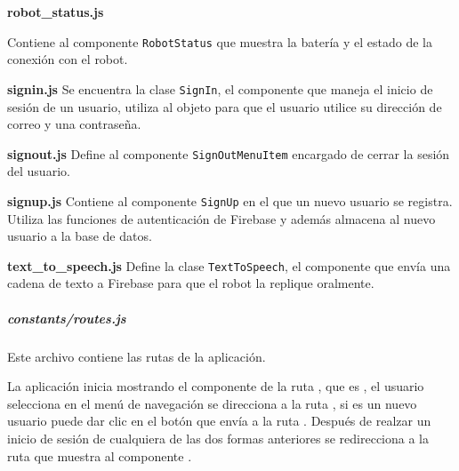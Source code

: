 \textbf{robot\_status.js}

Contiene al componente \texttt{RobotStatus} que muestra la batería y el estado de la conexión con el robot.

\textbf{signin.js}
\label{\detokenize{code_docs:signin-js}}
Se encuentra la clase \texttt{SignIn}, el componente que maneja el inicio de sesión de un usuario, utiliza al
objeto  para que el usuario utilice su dirección de correo y una
contraseña.


\textbf{signout.js}
\label{\detokenize{code_docs:signout-js}}
Define al componente \texttt{SignOutMenuItem} encargado de cerrar la sesión del usuario.


\textbf{signup.js}
\label{\detokenize{code_docs:signup-js}}
Contiene al componente \texttt{SignUp} en el que un nuevo usuario se registra. Utiliza las funciones
de autenticación de Firebase y además almacena al nuevo usuario a la base de
datos.

\textbf{text\_to\_speech.js}
\label{\detokenize{code_docs:text-to-speech-js}}
Define la clase \texttt{TextToSpeech}, el componente que envía una cadena de texto a Firebase para que el robot la
replique oralmente.

\subparagraph{constants/routes.js}
\label{\detokenize{code_docs:constants}}

Este archivo contiene las rutas de la aplicación.

%
\begin{sphinxVerbatim}[commandchars=\\\{\}]
    
    
    
    
\end{sphinxVerbatim}


La aplicación inicia mostrando el componente de la ruta , que es
, el usuario selecciona  en el menú de navegación
se direcciona a la ruta , si es un nuevo usuario puede dar clic
en el botón que envía a la ruta . Después de realzar un inicio de
sesión de cualquiera de las dos formas anteriores se redirecciona a la ruta
 que muestra al componente .

